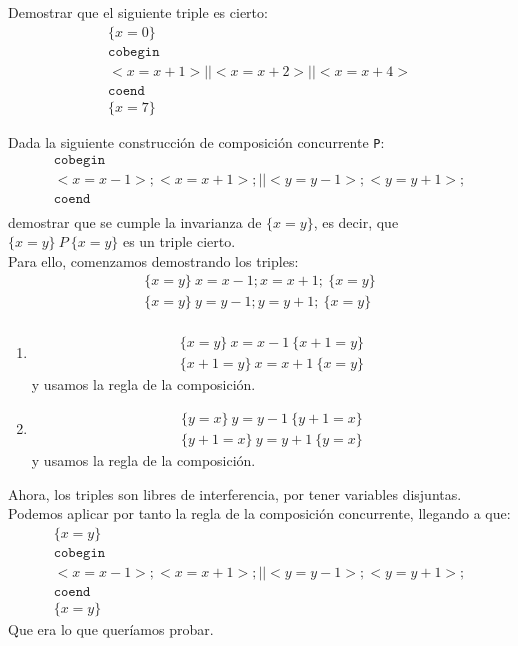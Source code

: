 \begin{ejercicio}
    Demostrar que el siguiente triple es cierto:
    \begin{gather*}
        \{x=0\}\\ 
        \texttt{cobegin} \\
        <x=x+1> || <x=x+2> || <x=x+4> \\
        \texttt{coend} \\
        \{x=7\}
    \end{gather*}
\end{ejercicio}

\begin{ejercicio}
    Dada la siguiente construcción de composición concurrente \verb|P|:
    \begin{gather*}
        \texttt{cobegin} \\
        <x=x-1>;<x=x+1>;||<y=y-1>;<y=y+1>; \\
        \texttt{coend} \\
    \end{gather*}
    demostrar que se cumple la invarianza de $\{x=y\}$, es decir, que $\{x=y\}\ P\ \{x=y\}$ es un triple cierto.\\

Para ello, comenzamos demostrando los triples:
\begin{gather*}
    \{x=y\}\ x=x-1;x=x+1;\ \{x=y\} \\
    \{x=y\}\ y=y-1;y=y+1;\ \{x=y\} \\
\end{gather*}
\begin{enumerate}
    \item 
        \begin{gather*}
            \{x=y\}\ x=x-1\ \{x+1=y\} \\
            \{x+1=y\}\ x=x+1\ \{x=y\}
        \end{gather*}
        y usamos la regla de la composición.
    \item 
        \begin{gather*}
            \{y=x\}\ y=y-1\ \{y+1=x\} \\
            \{y+1=x\}\ y=y+1\ \{y=x\}
        \end{gather*}
        y usamos la regla de la composición.
\end{enumerate}
Ahora, los triples son libres de interferencia, por tener variables disjuntas. Podemos aplicar por tanto la regla de la composición concurrente, llegando a que:
\begin{gather*}
    \{x=y\} \\
    \texttt{cobegin} \\
    <x=x-1>;<x=x+1>;||<y=y-1>;<y=y+1>; \\
    \texttt{coend} \\
    \{x=y\}
\end{gather*}
Que era lo que queríamos probar.
\end{ejercicio}


